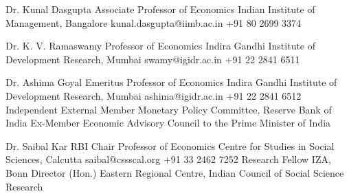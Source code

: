 %
%
%


\vspace*{10pt}

\begin{referees}
		{Dr. Kunal Dasgupta}
		{Associate Professor of Economics}
		{Indian Institute of Management, Bangalore}
		{kunal.dasgupta@iimb.ac.in}
		{+91 80 2699 3374}

		{Dr. K. V. Ramaswamy}
		{Professor of Economics}
		{Indira Gandhi Institute of Development Research, Mumbai}
		{swamy@igidr.ac.in}
		{+91 22 2841 6511}

	\lreferee
		{Dr. Ashima Goyal}
		{Emeritus Professor of Economics}
		{Indira Gandhi Institute of Development Research, Mumbai}
		{ashima@igidr.ac.in}
		{+91 22 2841 6512}
		{Independent External Member}
		{Monetary Policy Committee, Reserve Bank of India}
		{Ex-Member}
		{Economic Advisory Council to the Prime Minister of India}

	\lreferee
		{Dr. Saibal Kar}
		{RBI Chair Professor of Economics}
		{Centre for Studies in Social Sciences, Calcutta}
		{saibal@cssscal.org}
		{+91 33 2462 7252}
		{Research Fellow}
		{IZA, Bonn}
		{Director (Hon.)}
		{Eastern Regional Centre, Indian Council of Social Science Research}

\end{referees}